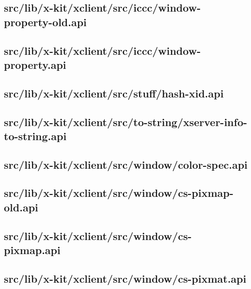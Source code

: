 \subsection{src/lib/x-kit/xclient/src/iccc/window-property-old.api}


\subsection{src/lib/x-kit/xclient/src/iccc/window-property.api}


\subsection{src/lib/x-kit/xclient/src/stuff/hash-xid.api}


\subsection{src/lib/x-kit/xclient/src/to-string/xserver-info-to-string.api}


\subsection{src/lib/x-kit/xclient/src/window/color-spec.api}


\subsection{src/lib/x-kit/xclient/src/window/cs-pixmap-old.api}


\subsection{src/lib/x-kit/xclient/src/window/cs-pixmap.api}


\subsection{src/lib/x-kit/xclient/src/window/cs-pixmat.api}


